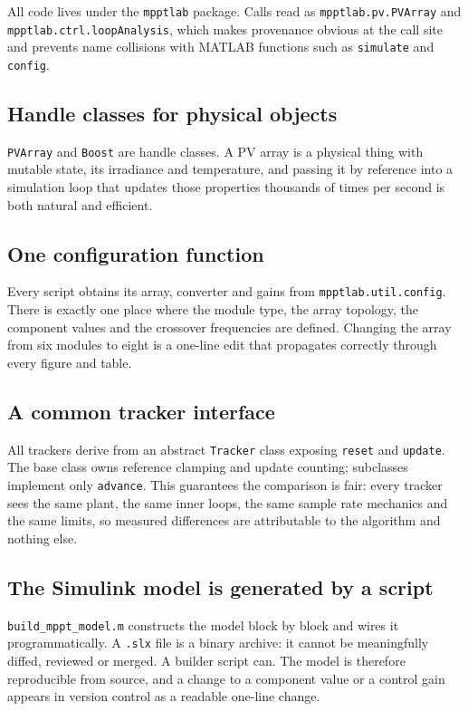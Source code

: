 All code lives under the \texttt{mpptlab} package. Calls read as
\texttt{mpptlab.pv.PVArray} and \texttt{mpptlab.ctrl.loopAnalysis}, which makes
provenance obvious at the call site and prevents name collisions with MATLAB
functions such as \texttt{simulate} and \texttt{config}.

\subsection{Handle classes for physical objects}

\texttt{PVArray} and \texttt{Boost} are handle classes. A PV array is a physical
thing with mutable state, its irradiance and temperature, and passing it by
reference into a simulation loop that updates those properties thousands of
times per second is both natural and efficient.

\subsection{One configuration function}

Every script obtains its array, converter and gains from
\texttt{mpptlab.util.config}. There is exactly one place where the module type,
the array topology, the component values and the crossover frequencies are
defined. Changing the array from six modules to eight is a one-line edit that
propagates correctly through every figure and table.

\subsection{A common tracker interface}

All trackers derive from an abstract \texttt{Tracker} class exposing
\texttt{reset} and \texttt{update}. The base class owns reference clamping and
update counting; subclasses implement only \texttt{advance}. This guarantees the
comparison is fair: every tracker sees the same plant, the same inner loops, the
same sample rate mechanics and the same limits, so measured differences are
attributable to the algorithm and nothing else.

\subsection{The Simulink model is generated by a script}

\texttt{build\_mppt\_model.m} constructs the model block by block and wires it
programmatically. A \texttt{.slx} file is a binary archive: it cannot be
meaningfully diffed, reviewed or merged. A builder script can. The model is
therefore reproducible from source, and a change to a component value or a
control gain appears in version control as a readable one-line change.

